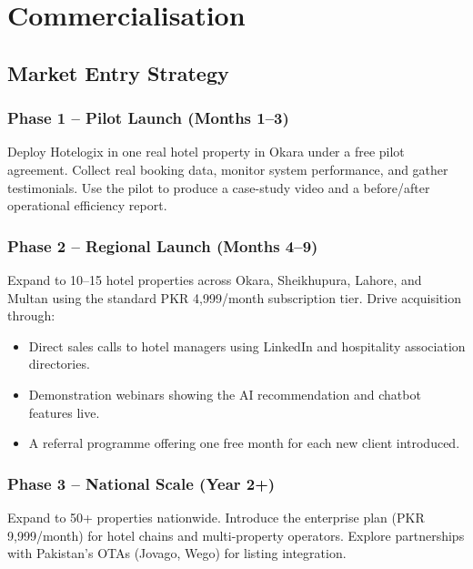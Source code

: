 \documentclass[12pt,a4paper]{report}
\begin{document}
\chapter{Commercialisation}

\section{Market Entry Strategy}

\subsection*{Phase 1 -- Pilot Launch (Months 1--3)}
Deploy Hotelogix in one real hotel property in Okara under a free pilot agreement. Collect real booking data, monitor system performance, and gather testimonials. Use the pilot to produce a case-study video and a before/after operational efficiency report.

\subsection*{Phase 2 -- Regional Launch (Months 4--9)}
Expand to 10--15 hotel properties across Okara, Sheikhupura, Lahore, and Multan using the standard PKR 4,999/month subscription tier. Drive acquisition through:
\begin{itemize}[leftmargin=*, label=\textbullet]
  \item Direct sales calls to hotel managers using LinkedIn and hospitality association directories.
  \item Demonstration webinars showing the AI recommendation and chatbot features live.
  \item A referral programme offering one free month for each new client introduced.
\end{itemize}

\subsection*{Phase 3 -- National Scale (Year 2+)}
Expand to 50+ properties nationwide. Introduce the enterprise plan (PKR 9,999/month) for hotel chains and multi-property operators. Explore partnerships with Pakistan's OTAs (Jovago, Wego) for listing integration.
\end{document}
